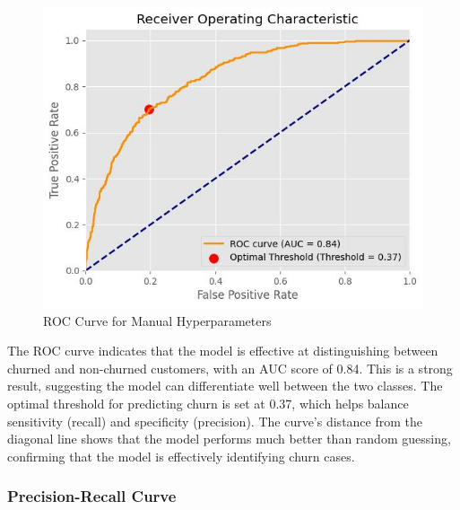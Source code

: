 \begin{figure}[hbt!]
    \centering
    \includegraphics[width=1\linewidth]{Images/5.5.4.a.jpg}
    \caption{ROC Curve for Manual Hyperparameters}
    \label{fig:enter-label}
\end{figure}

The ROC curve indicates that the model is effective at distinguishing between churned and non-churned customers, with an AUC score of 0.84. This is a strong result, suggesting the model can differentiate well between the two classes. The optimal threshold for predicting churn is set at 0.37, which helps balance sensitivity (recall) and specificity (precision). The curve’s distance from the diagonal line shows that the model performs much better than random guessing, confirming that the model is effectively identifying churn cases.

\subsubsection{Precision-Recall Curve}

